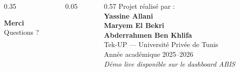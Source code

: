 \documentclass[aspectratio=169,12pt]{beamer}
\begin{document}
{
\begin{frame}[plain]
  \begin{columns}[T]
    \begin{column}{0.35\textwidth}
      \vspace{2.5cm}
      \begin{center}
        {\color{white}\Huge\bfseries Merci}\\[0.5cm]
        {\color{white!70}\normalsize Questions ?}
      \end{center}
    \end{column}
    \begin{column}{0.05\textwidth}\end{column}
    \begin{column}{0.57\textwidth}
      \vspace{2.5cm}
      {\color{ink!60}\small Projet réalisé par :}\\[0.4cm]
      {\color{ink}\bfseries Yassine Allani}\\
      {\color{ink}\bfseries Maryem El Bekri}\\
      {\color{ink}\bfseries Abderrahmen Ben Khlifa}\\[0.5cm]
      {\color{midgray}\small Tek-UP --- Université Privée de Tunis\\
      Année académique 2025--2026}\\[0.5cm]
      {\color{primary!60}\small\itshape Démo live disponible sur le dashboard ABIS}
    \end{column}
  \end{columns}
\end{frame}
}
\end{document}
